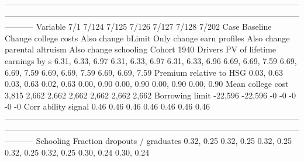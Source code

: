 -----------------------------------------------------------------------------------------------------------------------------------------------------------------------------------------------------------------------------------
                              Variable                         7/1                       7/124                    7/125                      7/126                          7/127                    7/128                    7/202
                                  Case                    Baseline        Change college costs       Also change bLimit  Only change earn profiles  Also change parental altruism    Also change schooling              Cohort 1940
                               Drivers                                                                                                                                                                                             
          PV of lifetime earnings by s            6.31, 6.33, 6.97            6.31, 6.33, 6.97         6.31, 6.33, 6.96           6.69, 6.69, 7.59               6.69, 6.69, 7.59         6.69, 6.69, 7.59         6.69, 6.69, 7.59
               Premium relative to HSG                  0.03, 0.63                  0.03, 0.63               0.02, 0.63                 0.00, 0.90                     0.00, 0.90               0.00, 0.90               0.00, 0.90
                     Mean college cost                       3,815                       2,662                    2,662                      2,662                          2,662                    2,662                    2,662
                       Borrowing limit                     -22,596                     -22,596                       -0                         -0                             -0                       -0                       -0
                   Corr ability signal                        0.46                        0.46                     0.46                       0.46                           0.46                     0.46                     0.46
-----------------------------------------------------------------------------------------------------------------------------------------------------------------------------------------------------------------------------------
                             Schooling                                                                                                                                                                                             
         Fraction dropouts / graduates                  0.32, 0.25                  0.32, 0.25               0.32, 0.25                 0.32, 0.25                     0.32, 0.25               0.30, 0.24               0.30, 0.24
